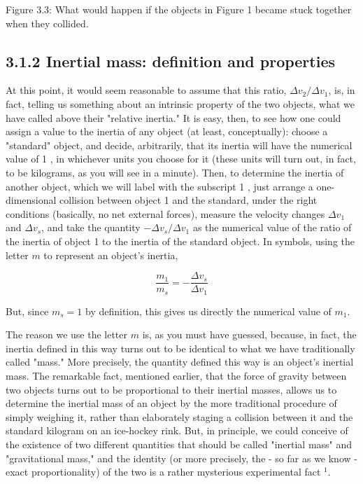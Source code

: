 \documentclass[10pt]{article}
\begin{document}
Figure 3.3: What would happen if the objects in Figure 1 became stuck together when they collided.

\subsection*{3.1.2 Inertial mass: definition and properties}
At this point, it would seem reasonable to assume that this ratio, $\Delta v_{2} / \Delta v_{1}$, is, in fact, telling us something about an intrinsic property of the two objects, what we have called above their "relative inertia." It is easy, then, to see how one could assign a value to the inertia of any object (at least, conceptually): choose a "standard" object, and decide, arbitrarily, that its inertia will have the numerical value of 1 , in whichever units you choose for it (these units will turn out, in fact, to be kilograms, as you will see in a minute). Then, to determine the inertia of another object, which we will label with the subscript 1 , just arrange a one-dimensional collision between object 1 and the standard, under the right conditions (basically, no net external forces), measure the velocity changes $\Delta v_{1}$ and $\Delta v_{s}$, and take the quantity $-\Delta v_{s} / \Delta v_{1}$ as the numerical value of the ratio of the inertia of object 1 to the inertia of the standard object. In symbols, using the letter $m$ to represent an object's inertia,


\begin{equation*}
\frac{m_{1}}{m_{s}}=-\frac{\Delta v_{s}}{\Delta v_{1}} \tag{3.1}
\end{equation*}


But, since $m_{s}=1$ by definition, this gives us directly the numerical value of $m_{1}$.

The reason we use the letter $m$ is, as you must have guessed, because, in fact, the inertia defined in this way turns out to be identical to what we have traditionally called "mass." More precisely, the quantity defined this way is an object's inertial mass. The remarkable fact, mentioned earlier, that the force of gravity between two objects turns out to be proportional to their inertial masses, allows us to determine the inertial mass of an object by the more traditional procedure of simply weighing it, rather than elaborately staging a collision between it and the standard kilogram on an ice-hockey rink. But, in principle, we could conceive of the existence of two different quantities that should be called "inertial mass" and "gravitational mass," and the identity (or more precisely, the - so far as we know - exact proportionality) of the two is a rather mysterious experimental fact ${ }^{1}$.
\end{document}
